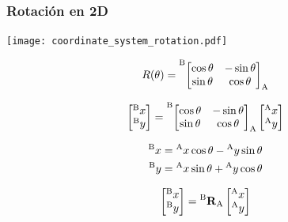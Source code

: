 \begin{frame}
    \frametitle{Rotación en 2D}

        \begin{center}
        \begin{minipage}{0.4\linewidth}
            \texttt{[image: coordinate\_system\_rotation.pdf]}
        \end{minipage}
        \hspace{1em}
        \begin{minipage}{0.5\linewidth}
            \begin{equation*}
                R(\theta) =
                \toCoord{\fromCoord{\begin{bmatrix}
                    \cos \theta & -\sin \theta \\
                    \sin \theta & \cos \theta
                \end{bmatrix}}{A}}{B}
            \end{equation*}

            \begin{equation*}
                \begin{bmatrix}
                    \toCoord{x}{B}\\
                    \toCoord{y}{B}
                \end{bmatrix} =
                \toCoord{\fromCoord{\begin{bmatrix}
                    \cos \theta &-\sin \theta \\
                    \sin \theta &\cos \theta
                \end{bmatrix}}{A}}{B}
                \begin{bmatrix}
                    \toCoord{x}{A}\\
                    \toCoord{y}{A}
                \end{bmatrix}
            \end{equation*}

            \begin{align*}
                \toCoord{x}{B} &= \toCoord{x}{A} \cos \theta -\toCoord{y}{A} \sin \theta\\
                \toCoord{y}{B} &= \toCoord{x}{A} \sin \theta + \toCoord{y}{A}\cos \theta
            \end{align*}

            \begin{equation*}
                \begin{bmatrix}
                    \toCoord{x}{B}\\
                    \toCoord{y}{B}
                \end{bmatrix} =
                \rotationCoord{B}{A}
                \begin{bmatrix}
                    \toCoord{x}{A}\\
                    \toCoord{y}{A}
                \end{bmatrix}
            \end{equation*}
        \end{minipage}
    \end{center}
\end{frame}


